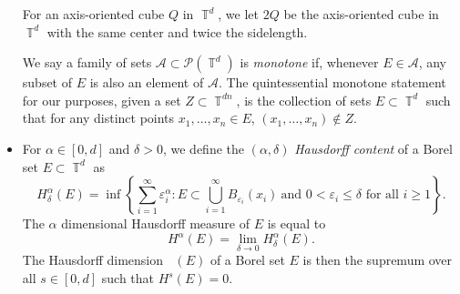 \documentclass[dvipsnames,letterpaper,12pt]{article}
\numberwithin{equation}{section}
\DeclareMathOperator{\hausdim}{\dim_{\mathbb{H}}}
\DeclareMathOperator{\TT}{\mathbb{T}}
\numberwithin{theorem}{section}
\begin{document}
\begin{itemize}
    For an axis-oriented cube $Q$ in $\TT^d$, we let $2Q$ be the axis-oriented cube in $\TT^d$ with the same center and twice the sidelength.

    We say a family of sets $\mathcal{A} \subset \mathcal{P}(\TT^d)$ is \emph{monotone} if, whenever $E \in \mathcal{A}$, any subset of $E$ is also an element of $\mathcal{A}$. The quintessential monotone statement for our purposes, given a set $Z \subset \TT^{dn}$, is the collection of sets $E \subset \TT^d$ such that for any distinct points $x_1,\dots,x_n \in E$, $(x_1,\dots,x_n) \not \in Z$.

    \item For $\alpha \in [0,d]$ and $\delta > 0$, we define the $(\alpha,\delta)$ \emph{Hausdorff content} of a Borel set $E \subset \TT^d$ as
    \[ H^\alpha_\delta(E) = \inf \left\{ \sum_{i = 1}^\infty \varepsilon_i^\alpha : E \subset \bigcup_{i = 1}^\infty B_{\varepsilon_i}(x_i)\ \text{and $0 < \varepsilon_i \leq \delta$ for all $i \geq 1$} \right\}. \]
    The $\alpha$ dimensional Hausdorff measure of $E$ is equal to
    \[ H^\alpha(E) = \lim_{\delta \to 0} H^\alpha_\delta(E). \]
    The Hausdorff dimension $\hausdim(E)$ of a Borel set $E$ is then the supremum over all $s \in [0,d]$ such that $H^s(E) = 0$.




\end{itemize}
\end{document}
